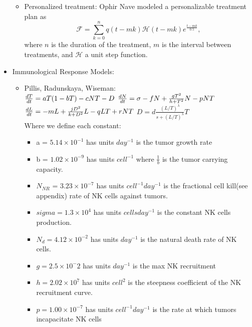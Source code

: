 \documentclass[11pt]{amsart}
\begin{document}
\begin{itemize}
\begin{itemize}
			\item Personalized treatment: Ophir Nave modeled a personalizable treatment plan as 
				\begin{equation}
					\mathscr{F} = \sum_{k=0}^n q(t-mk) \mathscr{H} (t-mk)e^{\frac{t-mk}{0.5}}\label{eq: NavePersonalChemo},
				\end{equation}
				where $n$ is the duration of the treatment, $m$ is the interval between treatments, and $\mathscr{H}$ a unit step function.
		\end{itemize}
	\item Immunological Response Models:
		\begin{itemize}
			\item Pillis, Radunskaya, Wiseman:\\
                    $\frac{dT}{dt} = aT(1-bT) - cNT - D\\$
                    $\frac{dN}{dt} = \sigma - fN +\frac{gT^2}{h + T^2}N - pNT\\$
                    $\frac{dL}{dt} = - mL +\frac{jD^2}{k + D^2}L - qLT + rNT\\$
                    $D = d\frac{(L/T)^\lambda}{s + (L/T)^\lambda}T$\\
                    Where we define each constant:
                    \begin{itemize}
                    \item a = $5.14 \times 10^{-1}$ has units $day^{-1}$ is the tumor growth rate
                    \item b = $1.02 \times 10^{-9}$ has units $cell^{-1}$ where  $\frac{1}{b}$ is the tumor carrying capacity.
                    \item $N_{NR}$ = $3.23 \times 10^{-7}$ has units $cell^{-1}day^{-1}$ is the fractional cell kill(see appendix) rate of NK cells against tumors.  
                    \item $sigma = 1.3 \times 10^4$ has units $cells day^{-1}$ is the constant NK cells production.
                    \item $N_d = 4.12 \times 10^{-2}$ has units $day^{-1}$ is the natural death rate of NK cells.
                    \item $g = 2.5 \times 10^-2$ has units $day^{-1}$ is the max NK recruitment
                    \item $h = 2.02 \times 10^7$ has units $cell^2$ is the steepness coefficient of the NK recruitment curve.
                    \item $p = 1.00 \times 10^{-7}$ has units $cell^{-1}day^{-1}$ is the rate at which tumors incapacitate NK cells

\end{itemize}
\end{itemize}
\end{itemize}
\end{document}
